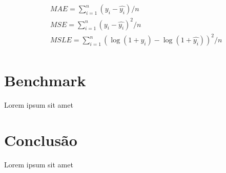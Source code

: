 \documentclass[twocolumn]{rbef}
\newcommand{\1}{\mathbbm{1}}
\begin{document}
\begin{equation}
    \begin{split}
        & MAE = \sum_{i=1}^{n} (y_{i} - \hat{y_{i}}) / n \\
        & MSE = \sum_{i=1}^{n} (y_{i} - \hat{y_{i}})^2 / n \\
        & MSLE = \sum_{i=1}^{n} (\log(1 + y_{i}) - \log(1 + \hat{y_{i}}))^2 / n \\
    \end{split}
\end{equation}

\section{Benchmark} \label{section3}

Lorem ipsum
sit amet

\section{Conclusão}

Lorem ipsum
sit amet
\end{document}
